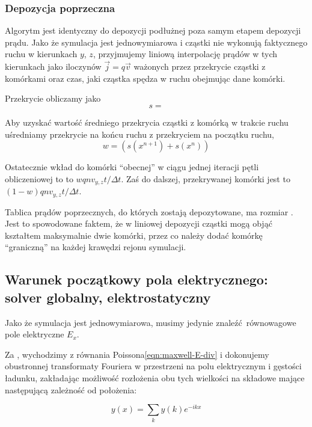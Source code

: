 \subsubsection{Depozycja poprzeczna} %
Algorytm jest identyczny do depozycji podłużnej poza samym etapem depozycji
prądu. Jako że symulacja jest jednowymiarowa i cząstki nie wykonują
faktycznego ruchu w kierunkach $y$, $z$, przyjmujemy liniową interpolację
prądów w tych kierunkach jako iloczynów $\vec{j}=q\vec{v}$ ważonych przez przekrycie
cząstki z komórkami oraz czas, jaki cząstka spędza w ruchu obejmując dane
komórki.

Przekrycie obliczamy jako
\begin{equation}
    s =
\end{equation}

Aby uzyskać wartość średniego przekrycia cząstki z komórką w trakcie ruchu
uśredniamy przekrycie na końcu ruchu z przekryciem na początku ruchu,
\begin{equation}
    w = {(s(x^{n+1}) + s(x^n))} %
\end{equation}

Ostatecznie wkład do komórki ``obecnej'' w ciągu jednej iteracji pętli obliczeniowej to 
to $w q n v_{y, z} t / \Delta t$.
Zaś do dalszej, przekrywanej komórki jest to  $(1-w) q n v_{y, z} t / \Delta t$.

Tablica prądów poprzecznych, do których zostają depozytowane, ma rozmiar
. Jest to spowodowane faktem, że w liniowej depozycji
cząstki mogą objąć kształtem maksymalnie dwie komórki, przez co należy dodać
komórkę ``graniczną'' na każdej krawędzi rejonu symulacji.


\subsection{Warunek początkowy pola elektrycznego: solver globalny, elektrostatyczny}
Jako że symulacja jest jednowymiarowa, musimy jedynie znaleźć równowagowe pole
elektryczne $E_x$.

Za \cite{birdsall}, wychodzimy z równania Poissona\ref{eqn:maxwell-E-div} i dokonujemy
obustronnej transformaty Fouriera w przestrzeni na polu elektrycznym i gęstości ładunku,
zakładając możliwość rozłożenia obu tych wielkości na składowe mające następującą zależność
od położenia:

\begin{equation}
y(x) = \sum_k y(k) e^{-i k x}
\label{eqn:fourier-decomposition}
\end{equation}


